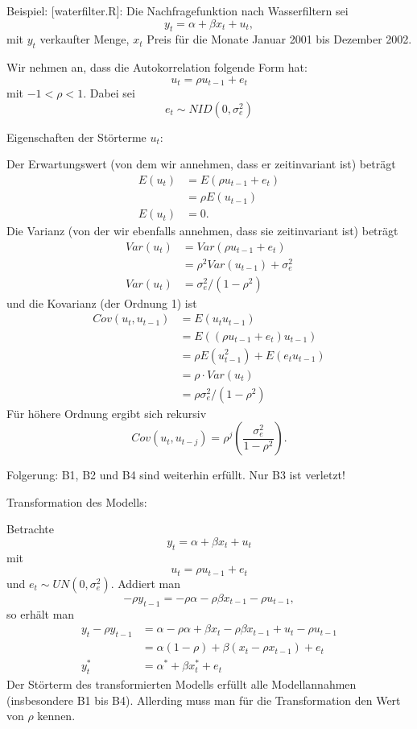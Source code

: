 \documentclass{article}
\begin{document}
Beispiel: [waterfilter.R]: Die Nachfragefunktion nach Wasserfiltern sei
\[y_{t}=\alpha +\beta x_{t}+u_{t}, \]
mit $y_{t}$ verkaufter Menge, $x_{t}$ Preis für die Monate
Januar 2001 bis Dezember 2002.

Wir nehmen an, dass die Autokorrelation folgende Form hat:
\[ u_{t}=\rho u_{t-1}+e_{t} \]
mit $-1<\rho <1$. Dabei sei
\[ e_{t}\sim NID(0,\sigma _{e}^{2}) \]

Eigenschaften der Störterme $u_{t}$:

Der Erwartungswert (von dem wir annehmen, dass er zeitinvariant ist)
beträgt
\begin{align*}
E(u_{t}) &= E(\rho u_{t-1}+e_{t}) \\
&=\rho E(u_{t-1}) \\
E(u_{t}) &=0.
\end{align*}
Die Varianz (von der wir ebenfalls annehmen, dass sie zeitinvariant
ist) beträgt
\begin{align*}
Var(u_{t}) &=Var(\rho u_{t-1}+e_{t}) \\
&=\rho ^{2}Var(u_{t-1})+\sigma _{e}^{2} \\
Var(u_{t}) &=\sigma _{e}^{2}/\left( 1-\rho ^{2}\right)
\end{align*}
und die Kovarianz (der Ordnung 1) ist
\begin{align*}
Cov(u_{t},u_{t-1}) &=E(u_{t}u_{t-1}) \\
&=E\left( \left( \rho u_{t-1}+e_{t}\right) u_{t-1}\right) \\
&=\rho E(u_{t-1}^{2})+E(e_{t}u_{t-1}) \\
&=\rho \cdot Var(u_{t})\\
&=\rho\sigma _{e}^{2}/\left( 1-\rho ^{2}\right)
\end{align*}
Für höhere Ordnung ergibt sich rekursiv
\[ Cov(u_{t},u_{t-j}) =\rho ^{j}\left( \frac{\sigma _{e}^{2}}{1-\rho ^{2}} \right). \]

Folgerung: B1, B2 und B4 sind weiterhin erfüllt. Nur B3 ist verletzt!

Transformation des Modells:

Betrachte
\[ y_{t}=\alpha +\beta x_{t}+u_{t} \]
mit
\[ u_{t}=\rho u_{t-1}+e_{t} \]
und $e_{t}\sim UN(0,\sigma _{e}^{2})$. Addiert man
\[ -\rho y_{t-1}=-\rho \alpha -\rho \beta x_{t-1}-\rho u_{t-1}, \]
so erhält man
\begin{align*}
y_{t}-\rho y_{t-1} &=\alpha -\rho \alpha +\beta x_{t}-\rho \beta x_{t-1}+u_{t}-\rho u_{t-1} \\
&=\alpha \left( 1-\rho \right) +\beta \left( x_{t}-\rho x_{t-1}\right)+e_{t}\\
y_{t}^* &= \alpha^* +\beta x_t^*+e_t
\end{align*}
Der Störterm des transformierten Modells erfüllt alle Modellannahmen (insbesondere
B1 bis B4). Allerding muss man für die Transformation den Wert von $\rho$ kennen.
\end{document}
